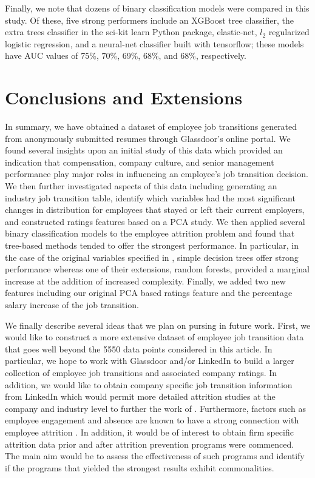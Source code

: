\documentclass[10pt]{article}
\begin{document}
Finally, we note that dozens of binary classification models were compared in this study.  Of these, 
five strong performers include an XGBoost tree classifier, the extra trees classifier in the 
sci-kit learn Python package, elastic-net, $l_2$ regularized logistic regression, and a 
neural-net classifier built with tensorflow; these models have AUC values of 75\%, 70\%, 
69\%, 68\%, and 68\%, respectively. 

\section{Conclusions and Extensions} \label{consec}

\hspace{\parindent}
In summary, we have obtained a dataset of employee job transitions generated from 
anonymously submitted resumes through Glassdoor's online portal. We found several 
insights upon an initial study of this data which provided an indication that 
compensation, company culture, and senior management performance play major 
roles in influencing an employee's job transition decision.  We then further investigated 
aspects of this data including generating an industry job transition table, identify 
which variables had the most significant changes in distribution for employees 
that stayed or left their current employers, and constructed ratings features 
based on a PCA study. We then applied several binary classification models 
to the employee attrition problem and found that tree-based methods tended to 
offer the strongest performance.  In particular, in the case of the original 
variables specified in \cite{Smart2016}, simple decision trees offer strong 
performance whereas one of their extensions, random forests, provided a 
marginal increase at the addition of increased complexity.  Finally, we added 
two new features including our original PCA based ratings feature
and the percentage salary increase of the job transition.  

We finally describe several ideas that we plan on pursing in future work.  First, 
we would like to construct a more extensive dataset of employee job transition data that goes
well beyond the 5550 data points considered in this article.  In particular, 
we hope to work with Glassdoor and/or LinkedIn to build a larger collection of 
employee job transitions and associated company ratings. In addition, we would like to 
obtain company specific job transition information from LinkedIn which would permit 
more detailed attrition studies at the company and industry level to further 
the work of \cite{Bennet1993}.  Furthermore, factors such as employee 
engagement and absence are known to have a strong connection with employee attrition 
\cite{Kumar2015,Mitra1992}.  In addition, it would be of interest to obtain 
firm specific attrition data prior and after attrition prevention programs 
were commenced.  The main aim would be to assess the effectiveness of such programs 
and identify if the programs that yielded the strongest results exhibit 
commonalities.  
\end{document}
